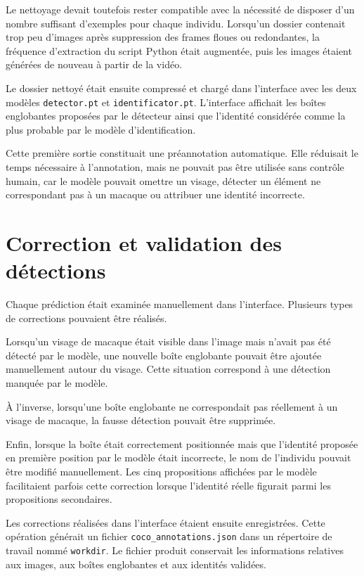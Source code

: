 \documentclass[11pt,a4paper]{report}
\begin{document}
Le nettoyage devait toutefois rester compatible avec la nécessité de disposer
d'un nombre suffisant d'exemples pour chaque individu. Lorsqu'un dossier
contenait trop peu d'images après suppression des frames floues ou redondantes,
la fréquence d'extraction du script Python était augmentée, puis les images
étaient générées de nouveau à partir de la vidéo.

Le dossier nettoyé était ensuite compressé et chargé dans l'interface avec les
deux modèles \texttt{detector.pt} et \texttt{identificator.pt}. L'interface
affichait les boîtes englobantes proposées par le détecteur ainsi que l'identité
considérée comme la plus probable par le modèle d'identification.

Cette première sortie constituait une préannotation automatique. Elle réduisait
le temps nécessaire à l'annotation, mais ne pouvait pas être utilisée sans
contrôle humain, car le modèle pouvait omettre un visage, détecter un élément ne
correspondant pas à un macaque ou attribuer une identité incorrecte.

\section{Correction et validation des détections}

Chaque prédiction était examinée manuellement dans l'interface. Plusieurs types
de corrections pouvaient être réalisés.

Lorsqu'un visage de macaque était visible dans l'image mais n'avait pas été
détecté par le modèle, une nouvelle boîte englobante pouvait être ajoutée
manuellement autour du visage. Cette situation correspond à une détection
manquée par le modèle.

À l'inverse, lorsqu'une boîte englobante ne correspondait pas réellement à un
visage de macaque, la fausse détection pouvait être supprimée.

Enfin, lorsque la boîte était correctement positionnée mais que l'identité
proposée en première position par le modèle était incorrecte, le nom de
l'individu pouvait être modifié manuellement. Les cinq propositions affichées
par le modèle facilitaient parfois cette correction lorsque l'identité réelle
figurait parmi les propositions secondaires.

Les corrections réalisées dans l'interface étaient ensuite enregistrées. Cette
opération générait un fichier \texttt{coco\_annotations.json} dans un répertoire
de travail nommé \texttt{workdir}. Le fichier produit conservait les
informations relatives aux images, aux boîtes englobantes et aux identités
validées.
\end{document}
